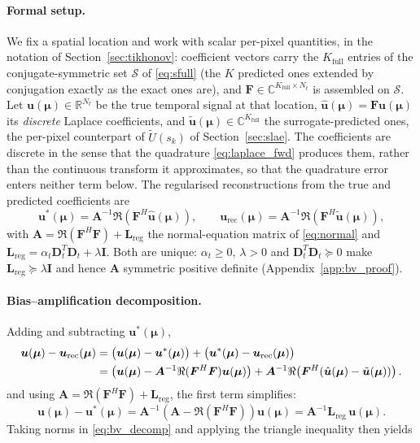 ﻿\documentclass[a4paper,12pt]{article}
\theoremstyle{definition}
\theoremstyle{remark}
\newcommand{\C}{\mathbb{C}}
\newcommand{\vmu}{\bm{\mu}}
\newcommand{\R}{\mathbb{R}}
\begin{document}
\paragraph{Formal setup.}
We fix a spatial location and work with scalar per-pixel quantities, in the notation of Section~\ref{sec:tikhonov}: coefficient vectors carry the $K_{\mathrm{full}}$ entries of the conjugate-symmetric set $\mathcal{S}$ of \eqref{eq:sfull} (the $K$ predicted ones extended by conjugation exactly as the exact ones are), and $\bm{F} \in \C^{K_{\mathrm{full}} \times N_t}$ is assembled on $\mathcal{S}$. Let $\bm{u}(\vmu) \in \R^{N_t}$ be the true temporal signal at that location, $\hat{\bm{u}}(\vmu) = \bm{F}\bm{u}(\vmu)$ its \emph{discrete} Laplace coefficients, and $\tilde{\bm{u}}(\vmu) \in \C^{K_{\mathrm{full}}}$ the surrogate-predicted ones, the per-pixel counterpart of $\tilde{U}(s_k)$ of Section~\ref{sec:slae}. The coefficients are discrete in the sense that the quadrature \eqref{eq:laplace_fwd} produces them, rather than the continuous transform it approximates, so that the quadrature error enters neither term below. The regularised reconstructions from the true and predicted coefficients are
\begin{equation}
    \bm{u}^*(\vmu) = \bm{A}^{-1}\Re\!\left(\bm{F}^H\hat{\bm{u}}(\vmu)\right), \qquad
    \bm{u}_{\mathrm{rec}}(\vmu) = \bm{A}^{-1}\Re\!\left(\bm{F}^H\tilde{\bm{u}}(\vmu)\right),
\end{equation}
with $\bm{A} = \Re(\bm{F}^H\bm{F}) + \bm{L}_{\mathrm{reg}}$ the normal-equation matrix of \eqref{eq:normal} and $\bm{L}_{\mathrm{reg}} = \alpha_t\bm{D}_t^T\bm{D}_t + \lambda\bm{I}$. Both are unique: $\alpha_t \ge 0$, $\lambda > 0$ and $\bm{D}_t^T\bm{D}_t \succeq 0$ make $\bm{L}_{\mathrm{reg}} \succeq \lambda\bm{I}$ and hence $\bm{A}$ symmetric positive definite (Appendix~\ref{app:bv_proof}).

\paragraph{Bias--amplification decomposition.}
Adding and subtracting $\bm{u}^*(\vmu)$,
\begin{align}
    \bm{u}(\vmu) - \bm{u}_{\mathrm{rec}}(\vmu)
    &= \bigl(\bm{u}(\vmu) - \bm{u}^*(\vmu)\bigr) + \bigl(\bm{u}^*(\vmu) - \bm{u}_{\mathrm{rec}}(\vmu)\bigr) \notag \\
    &= \bigl(\bm{u}(\vmu) - \bm{A}^{-1}\Re(\bm{F}^H\bm{F})\bm{u}(\vmu)\bigr) + \bm{A}^{-1}\Re\!\left(\bm{F}^H\!\left(\hat{\bm{u}}(\vmu) - \tilde{\bm{u}}(\vmu)\right)\right). \label{eq:bv_decomp}
\end{align}
and using $\bm{A} = \Re(\bm{F}^H\bm{F}) + \bm{L}_{\mathrm{reg}}$, the first term simplifies:
\begin{equation}
    \bm{u}(\vmu) - \bm{u}^*(\vmu) = \bm{A}^{-1}\!\left(\bm{A} - \Re(\bm{F}^H\bm{F})\right)\bm{u}(\vmu) = \bm{A}^{-1}\bm{L}_{\mathrm{reg}}\,\bm{u}(\vmu). \label{eq:bias_simplified}
\end{equation}
Taking norms in \eqref{eq:bv_decomp} and applying the triangle inequality then yields
\end{document}
